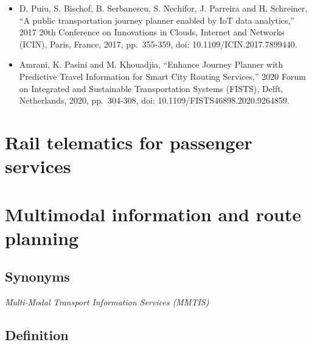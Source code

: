 \documentclass[
]{book}
\begin{document}
\begin{itemize}
\item
  D. Puiu, S. Bischof, B. Serbanescu, S. Nechifor, J. Parreira and H. Schreiner, ``A public transportation journey planner enabled by IoT data analytics,'' 2017 20th Conference on Innovations in Clouds, Internet and Networks (ICIN), Paris, France, 2017, pp.~355-359, doi: 10.1109/ICIN.2017.7899440.
\item
  Amrani, K. Pasini and M. Khouadjia, ``Enhance Journey Planner with Predictive Travel Information for Smart City Routing Services,'' 2020 Forum on Integrated and Sustainable Transportation Systems (FISTS), Delft, Netherlands, 2020, pp.~304-308, doi: 10.1109/FISTS46898.2020.9264859.
\end{itemize}

\hypertarget{telematics_passenger}{%
\section{Rail telematics for passenger services}\label{telematics_passenger}}

\hypertarget{info_and_route_planning}{%
\section{Multimodal information and route planning}\label{info_and_route_planning}}

\hypertarget{synonyms-11}{%
\subsection*{Synonyms}\label{synonyms-11}}

\emph{Multi-Modal Transport Information Services (MMTIS)}

\hypertarget{definition-11}{%
\subsection*{Definition}\label{definition-11}}
\end{document}
